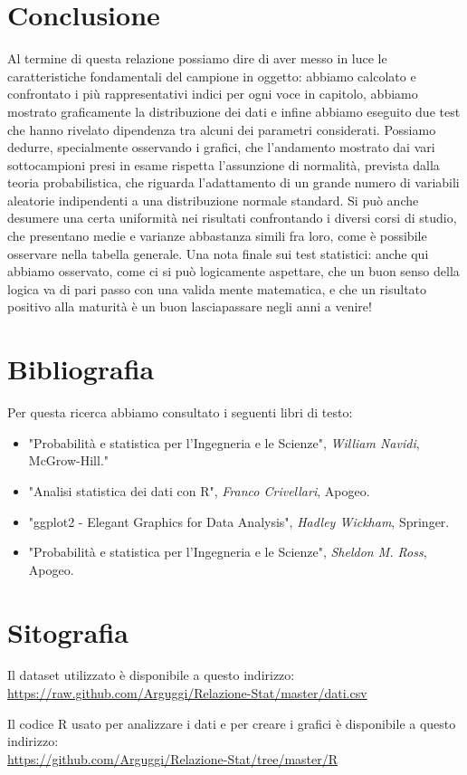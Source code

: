 \clearpage
\section{Conclusione}
Al termine di questa relazione possiamo dire di aver messo in luce le caratteristiche fondamentali del campione in oggetto: abbiamo calcolato e confrontato i più rappresentativi indici per ogni voce in capitolo, abbiamo mostrato graficamente la distribuzione dei dati e infine abbiamo eseguito due test che hanno rivelato dipendenza tra alcuni dei parametri considerati.
Possiamo dedurre, specialmente osservando i grafici, che l’andamento mostrato dai vari sottocampioni presi in esame rispetta l’assunzione di normalità, prevista dalla teoria probabilistica, che riguarda l’adattamento di un grande numero di variabili aleatorie indipendenti a una distribuzione normale standard.  
Si può anche desumere una certa uniformità nei risultati confrontando i diversi corsi di studio, che presentano medie e varianze abbastanza simili fra loro, come è possibile osservare nella tabella generale.
Una nota finale sui test statistici: anche qui abbiamo osservato, come ci si può logicamente aspettare, che un buon senso della logica va di pari passo con una valida mente matematica, e che un risultato positivo alla maturità è un buon lasciapassare negli anni a venire!
\clearpage

\section{Bibliografia}
Per questa ricerca abbiamo consultato i seguenti libri di testo:
\begin{itemize}
  \item "Probabilità e statistica per l’Ingegneria e le Scienze", \textit{William Navidi}, McGrow-Hill."
  \item "Analisi statistica dei dati con R", \textit{Franco Crivellari}, Apogeo.
  \item "ggplot2 - Elegant Graphics for Data Analysis", \textit{Hadley Wickham}, Springer.
  \item "Probabilità e statistica per l’Ingegneria e le Scienze", \textit{Sheldon M. Ross}, Apogeo.
\end{itemize}

\section{Sitografia}

Il dataset utilizzato è disponibile a questo indirizzo: \\
\url{https://raw.github.com/Arguggi/Relazione-Stat/master/dati.csv}

\noindent Il codice R usato per analizzare i dati e per creare i grafici è disponibile a questo indirizzo: \\
\url{https://github.com/Arguggi/Relazione-Stat/tree/master/R}
